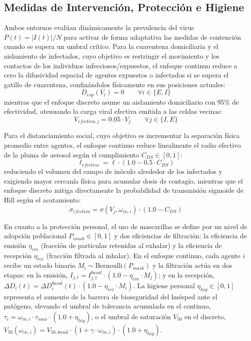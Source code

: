 \documentclass[conference]{IEEEtran}
\begin{document}
\subsection{Medidas de Intervención, Protección e Higiene}
Ambos entornos evalúan dinámicamente la prevalencia del virus $P(t) = |I(t)|/N$ para activar de forma adaptativa las medidas de contención cuando se supera un umbral crítico. Para la cuarentena domiciliaria y el aislamiento de infectados, cuyo objetivo es restringir el movimiento y los contactos de los individuos infecciosos/expuestos, el enfoque continuo reduce a cero la difusividad espacial de agentes expuestos o infectados si se supera el gatillo de cuarentena, confinándolos físicamente en sus posiciones actuales:
\begin{equation}
D_{esp}(V_i) = 0 \qquad \forall i \in \{E, I\}
\end{equation}
mientras que el enfoque discreto asume un aislamiento domiciliario con 95\% de efectividad, atenuando la carga viral efectiva emitida a las celdas vecinas:
\begin{equation}
V_{efectiva, j} = 0.05 \cdot V_j \qquad \forall j \in \{I, E\}
\end{equation}

Para el distanciamiento social, cuyo objetivo es incrementar la separación física promedio entre agentes, el enfoque continuo reduce linealmente el radio efectivo de la pluma de aerosol según el cumplimiento $C_{DS}\in[0,1]$:
\begin{equation}
\ell_{efectivo} = \ell \cdot (1.0 - 0.5 \cdot C_{DS})
\end{equation}
reduciendo el volumen del campo de inóculo alrededor de los infectados y exigiendo mayor cercanía física para acumular dosis de contagio, mientras que el enfoque discreto mitiga directamente la probabilidad de transmisión sigmoide de Hill según el acatamiento:
\begin{equation}
\sigma_{efectiva} = \sigma(V_j, \omega_{in,i}) \cdot (1.0 - C_{DS})
\end{equation}

En cuanto a la protección personal, el uso de mascarillas se define por un nivel de adopción poblacional $P_{mask}\in[0,1]$ y dos eficiencias de filtración: la eficiencia de emisión $\eta_{em}$ (fracción de partículas retenidas al exhalar) y la eficiencia de recepción $\eta_{rec}$ (fracción filtrada al inhalar). En el enfoque continuo, cada agente $i$ recibe un estado binario $M_i\sim\text{Bernoulli}(P_{mask})$ y la filtración actúa en dos etapas: en la emisión, $I_{j,t} = I_{j,t}^{basal}\cdot(1.0-\eta_{em}\cdot M_j)$; y en la recepción, $\Delta D_i(t) = \Delta D_i^{basal}(t)\cdot(1.0-\eta_{rec}\cdot M_i)$. La higiene personal $\eta_{hig}\in[0,1]$ representa el aumento de la barrera de bioseguridad del huésped ante el patógeno, elevando el umbral de tolerancia acumulada en el continuo, $\tau_i = \omega_{in,i}\cdot\tau_{max}\cdot(1.0+\eta_{hig})$, o el umbral de saturación $V_{50}$ en el discreto, $V_{50}(\omega_{in,i}) = V_{50,basal}\cdot(1+\gamma\cdot\omega_{in,i})\cdot(1.0+\eta_{hig})$.
\end{document}
